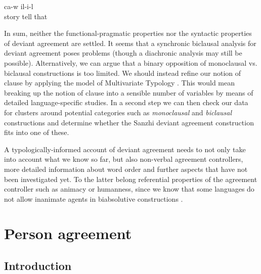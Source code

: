 \begin{exe}
	\ex	\label{ex:when, he was talking.}
		ca-w	il-i-l\\
		story	tell		that\\
	\glt	{}
\end{exe}

In sum, neither the functional-pragmatic properties nor the syntactic properties of deviant agreement are settled. It seems that a synchronic biclausal analysis for deviant agreement poses problems (though a diachronic analysis may still be possible). Alternatively, we can argue that a binary opposition of monoclausal vs. biclausal constructions is too limited. We should instead refine our notion of clause by applying the model of Multivariate Typology \citep{Bickel2011, Bickel2015}. This would mean breaking up the notion of clause into a sensible number of variables by means of detailed language-specific studies. In a second step we can then check our data for clusters around potential categories such as \textit{monoclausal} and \textit{biclausal} constructions and determine whether the Sanzhi deviant agreement construction fits into one of these.

A typologically-informed account of deviant agreement needs to not only take into account what we know so far, but also non-verbal agreement controllers, more detailed information about word order and further aspects that have not been investigated yet. To the latter belong referential properties of the agreement controller such as animacy or humanness, since we know that some languages do not allow inanimate agents in biabsolutive constructions \citep{Forker2012a}.



\section{Person agreement}
\label{sec:Person agreement}



\subsection{Introduction}
\label{ssec:IntroductionPersonAgreement}

